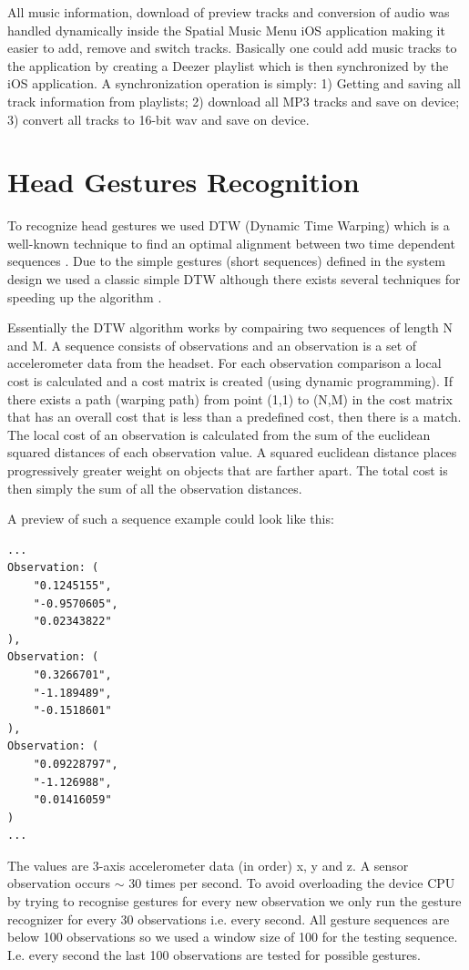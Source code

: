 All music information, download of preview tracks and conversion of audio was handled dynamically inside the Spatial Music Menu iOS application making it easier to add, remove and switch tracks. Basically one could add music tracks to the application by creating a Deezer playlist which is then synchronized by the iOS application. A synchronization operation is simply: 1) Getting and saving all track information from playlists; 2) download all MP3 tracks and save on device; 3) convert all tracks to 16-bit wav and save on device.


\section{Head Gestures Recognition}
\label{sec:implementationgesturerecognition}
To recognize head gestures we used DTW (Dynamic Time Warping) which is a well-known technique to find an optimal alignment between two time dependent sequences \cite{muller_dynamic_2007}. Due to the simple gestures (short sequences) defined in the system design we used a classic simple DTW although there exists several techniques for speeding up the algorithm \cite{muller_dynamic_2007,salvador_toward_2007,akl_accelerometer-based_2010}. 

Essentially the DTW algorithm works by compairing two sequences of length N and M. A sequence consists of observations and an observation is a set of accelerometer data from the headset. For each observation comparison a local cost is calculated and a cost matrix is created (using dynamic programming). If there exists a path (warping path) from point (1,1) to (N,M) in the cost matrix that has an overall cost that is less than a predefined cost, then there is a match. The local cost of an observation is calculated from the sum of the euclidean squared distances of each observation value. A squared euclidean distance places progressively greater weight on objects that are farther apart. The total cost is then simply the sum of all the observation distances.

A preview of such a sequence example could look like this:

\begin{lstlisting}
...
Observation: (
    "0.1245155",
    "-0.9570605",
    "0.02343822"
),
Observation: (
    "0.3266701",
    "-1.189489",
    "-0.1518601"
),
Observation: (
    "0.09228797",
    "-1.126988",
    "0.01416059"
)
...
\end{lstlisting}

The values are 3-axis accelerometer data (in order) x, y and z. A sensor observation occurs $\sim$ 30 times per second. To avoid overloading the device CPU by trying to recognise gestures for every new observation we only run the gesture recognizer for every 30 observations i.e. every second. All gesture sequences are below 100 observations so we used a window size of 100 for the testing sequence. I.e. every second the last 100 observations are tested for possible gestures.

